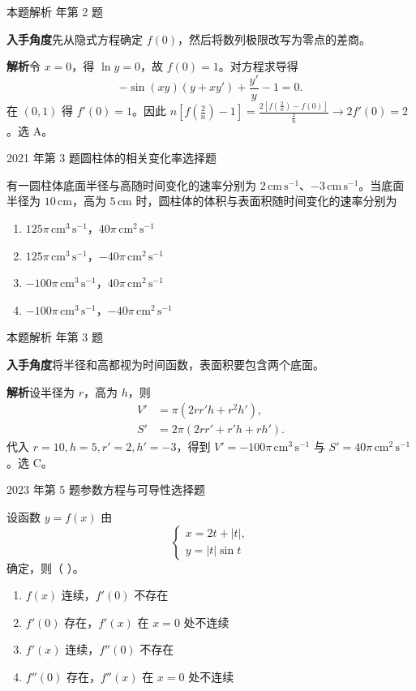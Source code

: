 \documentclass[UTF8,zihao=-4,fontset=fandol]{ctexart}
\newenvironment{abcd}{\begin{enumerate}[label=\textup{(\Alph*)},leftmargin=2.3em,itemsep=1pt,topsep=4pt,parsep=1pt]}{\end{enumerate}}
\newcommand{\choices}[4]{%
  \begin{abcd}
    \item #1
    \item #2
    \item #3
    \item #4
  \end{abcd}}
\newcommand{\QuestionPage}[6]{%
  \par\noindent\begin{minipage}{\linewidth}
  \raggedright
  {\small\textcolor{black!60}{#3\quad #5}\hfill\textcolor{accent}{#2}}\par\smallskip}
\newcommand{\QuestionEnd}{\end{minipage}\par\medskip}
\newcommand{\QuestionPage}[6]{%
  \clearpage
  {\small\textcolor{accent}{#1\hfill #2}}\par\medskip
  {\small\textcolor{black!60}{#3\quad #5\hfill #6}}\par\vspace{9bp}}
\newcommand{\QuestionEnd}{}
\newenvironment{QuestionSolution}[1]{%
  \clearpage
  {\small\textcolor{black!60}{本题解析\quad #1}}\par\medskip
}{\par\clearpage}
\begin{document}
\begin{QuestionSolution}{2013 年第 2 题}
\textbf{入手角度}\quad 先从隐式方程确定 \(f(0)\)，然后将数列极限改写为零点的差商。

\textbf{解析}\quad 令 \(x=0\)，得 \(\ln y=0\)，故 \(f(0)=1\)。对方程求导得
\[
-\sin(xy)(y+xy')+\frac{y'}y-1=0.
\]
在 \((0,1)\) 得 \(f'(0)=1\)。因此 \(n[f(\frac{2}{n})-1]=\frac{2[f(\frac{2}{n})-f(0)]}{\frac{2}{n}}\to2f'(0)=\boxed{2}\)。选 A。
\end{QuestionSolution}

\QuestionPage{2.2 求导的基本法则}{选择题}{2021 年第 3 题}{1}{圆柱体的相关变化率}{058 / 234}
有一圆柱体底面半径与高随时间变化的速率分别为 \(2\,\mathrm{cm}\,\mathrm{s}^{-1}\)、\(-3\,\mathrm{cm}\,\mathrm{s}^{-1}\)。当底面半径为 \(10\,\mathrm{cm}\)，高为 \(5\,\mathrm{cm}\) 时，圆柱体的体积与表面积随时间变化的速率分别为
\choices{\(125\pi\,\mathrm{cm}^{3}\,\mathrm{s}^{-1}\)，\(40\pi\,\mathrm{cm}^{2}\,\mathrm{s}^{-1}\)}{\(125\pi\,\mathrm{cm}^{3}\,\mathrm{s}^{-1}\)，\(-40\pi\,\mathrm{cm}^{2}\,\mathrm{s}^{-1}\)}{\(-100\pi\,\mathrm{cm}^{3}\,\mathrm{s}^{-1}\)，\(40\pi\,\mathrm{cm}^{2}\,\mathrm{s}^{-1}\)}{\(-100\pi\,\mathrm{cm}^{3}\,\mathrm{s}^{-1}\)，\(-40\pi\,\mathrm{cm}^{2}\,\mathrm{s}^{-1}\)}
\QuestionEnd

\begin{QuestionSolution}{2021 年第 3 题}
\textbf{入手角度}\quad 将半径和高都视为时间函数，表面积要包含两个底面。

\textbf{解析}\quad 设半径为 \(r\)，高为 \(h\)，则
\[
\begin{aligned}
V'&=\pi(2rr'h+r^2h'),\\
S'&=2\pi(2rr'+r'h+rh').
\end{aligned}
\]
代入 \(r=10,h=5,r'=2,h'=-3\)，得到 \(V'=-100\pi\,\mathrm{cm}^3\,\mathrm{s}^{-1}\) 与 \(S'=40\pi\,\mathrm{cm}^2\,\mathrm{s}^{-1}\)。选 C。
\end{QuestionSolution}

\QuestionPage{2.2 求导的基本法则}{选择题}{2023 年第 5 题}{1}{参数方程与可导性}{059 / 234}
设函数 \(y=f(x)\) 由
\[\begin{cases}
x=2t+|t|,\\
y=|t|\sin t
\end{cases}
\]
确定，则（ ）。
\choices{\(f(x)\) 连续，\(f'(0)\) 不存在}{\(f'(0)\) 存在，\(f'(x)\) 在 \(x=0\) 处不连续}{\(f'(x)\) 连续，\(f''(0)\) 不存在}{\(f''(0)\) 存在，\(f''(x)\) 在 \(x=0\) 处不连续}
\QuestionEnd
\end{document}
